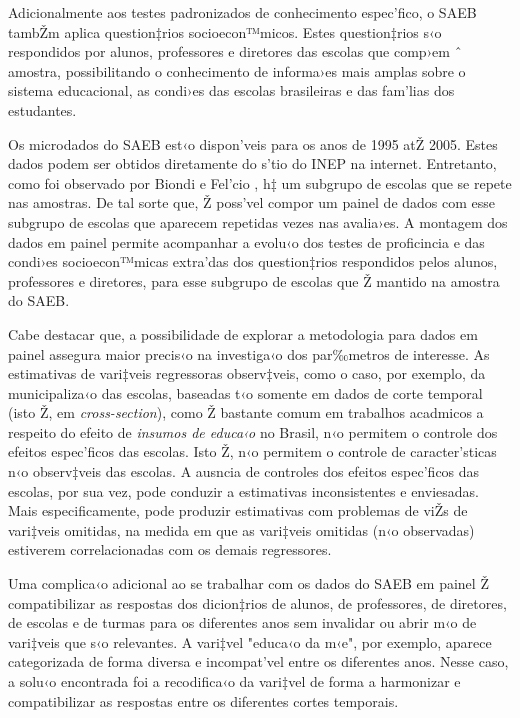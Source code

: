 \documentclass[a4paper, 12pt]{article}
\begin{document}


Adicionalmente aos testes padronizados de conhecimento espec’fico, o SAEB tambŽm aplica question‡rios socioecon™micos. Estes question‡rios s‹o respondidos por alunos, professores e diretores das escolas que comp›em ˆ amostra, possibilitando o conhecimento de informa›es mais amplas sobre o sistema educacional, as condi›es das escolas brasileiras e das fam’lias dos estudantes.

Os microdados do SAEB est‹o dispon’veis para os anos de 1995 atŽ 2005. Estes dados podem ser obtidos diretamente do s’tio do INEP na internet. Entretanto, como foi observado por Biondi e Fel’cio \citeyear{biondi_2007_atributos}, h‡ um subgrupo de escolas que se repete nas amostras. De tal sorte que, Ž poss’vel compor um painel de dados com esse subgrupo de escolas que aparecem repetidas vezes nas avalia›es. A montagem dos dados em painel permite acompanhar a evolu‹o dos testes de proficincia e das condi›es socioecon™micas extra’das dos question‡rios respondidos pelos alunos, professores e diretores, para esse subgrupo de escolas que Ž mantido na amostra do SAEB. 

Cabe destacar que, a possibilidade de explorar a metodologia para dados em painel assegura maior precis‹o na investiga‹o dos par‰metros de interesse. As estimativas de vari‡veis regressoras observ‡veis, como o caso, por exemplo, da municipaliza‹o das escolas, baseadas t‹o somente em dados de corte temporal (isto Ž, em  \emph{cross-section}), como Ž bastante comum em trabalhos acadmicos a respeito do efeito de \emph{insumos de educa‹o} no Brasil, n‹o permitem o controle dos efeitos espec’ficos das escolas. Isto Ž, n‹o permitem o controle de caracter’sticas n‹o observ‡veis das escolas. A ausncia de controles dos  efeitos espec’ficos das escolas, por sua vez, pode conduzir a estimativas inconsistentes e enviesadas. Mais especificamente, pode produzir estimativas com problemas de viŽs de vari‡veis omitidas, na medida em que as vari‡veis omitidas (n‹o observadas) estiverem correlacionadas com os demais regressores.

Uma complica‹o adicional ao se trabalhar com os dados do SAEB em painel Ž compatibilizar as respostas dos dicion‡rios de alunos, de professores, de diretores, de escolas e de turmas para os diferentes anos sem invalidar ou abrir m‹o de vari‡veis que s‹o relevantes. A vari‡vel "educa‹o da m‹e", por exemplo, aparece categorizada de forma diversa e incompat’vel entre os diferentes anos. Nesse caso, a solu‹o encontrada foi a recodifica‹o da vari‡vel de forma a harmonizar e compatibilizar as respostas entre os diferentes cortes temporais. 
\end{document}

